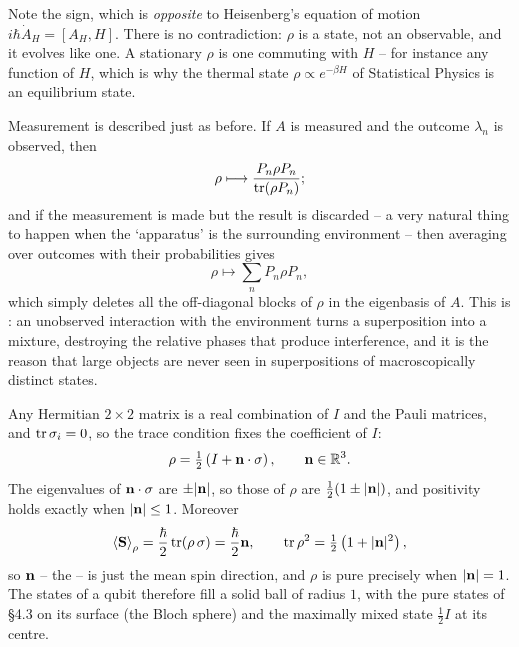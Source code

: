\documentclass[a4paper]{scrartcl}
\newcommand{\half}{\tfrac{1}{2}}
\begin{document}
Note the sign, which is \emph{opposite} to Heisenberg's equation of motion $i\hbar \dot A_H = [A_H, H]$. There is no contradiction: $\rho$ is a state, not an observable, and it evolves like one. A stationary $\rho$ is one commuting with $H$ -- for instance any function of $H$, which is why the thermal state $\rho \propto e^{-\beta H}$ of Statistical Physics is an equilibrium state.

Measurement is described just as before. If $A$ is measured and the outcome $\lambda_n$ is observed, then
$$
\rho \longmapsto \frac{P_n \rho P_n}{\tr(\rho P_n)};
$$
and if the measurement is made but the result is discarded -- a very natural thing to happen when the `apparatus' is the surrounding environment -- then averaging over outcomes with their probabilities gives
$$
\rho \longmapsto \sum_n P_n \rho P_n,
$$
which simply deletes all the off-diagonal blocks of $\rho$ in the eigenbasis of $A$. This is : an unobserved interaction with the environment turns a superposition into a mixture, destroying the relative phases that produce interference, and it is the reason that large objects are never seen in superpositions of macroscopically distinct states.

\begin{example}
    Any Hermitian $2\times2$ matrix is a real combination of $I$ and the Pauli matrices, and $\tr\sigma_i = 0$, so the trace condition fixes the coefficient of $I$:
    $$
    \rho = \half\left( I + \vv{n}\cdot\vv\sigma \right), \qquad \vv n \in \R^3.
    $$
    The eigenvalues of $\mathbf{n} \cdot \mathbf{\sigma}$ are $\pm\lvert\mathbf{n}\rvert$, so those of $\rho$ are $\half(1\pm\abs{\vv n})$, and positivity holds exactly when $\lvert\mathbf{n}\rvert\leq1$. Moreover
    $$
    \expval{\vv S}_\rho = \frac{\hbar}{2}\tr(\rho\,\vv\sigma) = \frac{\hbar}{2}\vv n, \qquad \tr\rho^2 = \half\left(1 + \abs{\vv n}^2\right),
    $$
    so $\mathbf{n}$ -- the  -- is just the mean spin direction, and $\rho$ is pure precisely when $\lvert\mathbf{n}\rvert = 1$. The states of a qubit therefore fill a solid ball of radius $1$, with the pure states of \S4.3 on its surface (the Bloch sphere) and the maximally mixed state $\half I$ at its centre.
\end{example}
\end{document}
